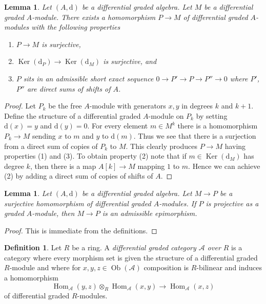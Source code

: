 \documentclass{stacks-project}
\theoremstyle{plain}
\newtheorem{lemma}[subsection]{Lemma}
\theoremstyle{definition}
\newtheorem{definition}[subsection]{Definition}
\theoremstyle{remark}
\numberwithin{equation}{subsection}
\def\Hom{\mathop{\mathrm{Hom}}\nolimits}
\def\Ob{\mathop{\mathrm{Ob}}\nolimits}
\def\Ker{\mathop{\mathrm{Ker}}}
\begin{document}
\begin{lemma}
\label{lemma-good-quotient}
Let $(A, \text{d})$ be a differential graded algebra.
Let $M$ be a differential graded $A$-module. There exists a homomorphism
$P \to M$ of differential graded $A$-modules with the following
properties
\begin{enumerate}
\item $P \to M$ is surjective,
\item $\Ker(\text{d}_P) \to \Ker(\text{d}_M)$ is surjective, and
\item $P$ sits in an admissible short exact sequence
$0 \to P' \to P \to P'' \to 0$ where $P'$, $P''$ are direct sums
of shifts of $A$.
\end{enumerate}
\end{lemma}

\begin{proof}
Let $P_k$ be the free $A$-module with generators $x, y$ in degrees
$k$ and $k + 1$. Define the structure of a differential graded
$A$-module on $P_k$ by setting $\text{d}(x) = y$ and $\text{d}(y) = 0$.
For every element $m \in M^k$ there is a homomorphism
$P_k \to M$ sending $x$ to $m$ and $y$ to $\text{d}(m)$.
Thus we see that there is a surjection from a direct sum
of copies of $P_k$ to $M$. This clearly produces $P \to M$
having properties (1) and (3). To obtain property (2) note
that if $m \in \Ker(\text{d}_M)$ has degree $k$, then there is a map
$A[k] \to M$ mapping $1$ to $m$. Hence we can achieve (2) by adding
a direct sum of copies of shifts of $A$.
\end{proof}

\begin{lemma}
\label{lemma-target-graded-projective}
Let $(A, \text{d})$ be a differential graded algebra.
Let $M \to P$ be a surjective homomorphism of differential graded
$A$-modules. If $P$ is projective as a graded $A$-module, then
$M \to P$ is an admissible epimorphism.
\end{lemma}

\begin{proof}
This is immediate from the definitions.
\end{proof}

\begin{definition}
\label{definition-dga-category}
Let $R$ be a ring. A {\it differential graded category $\mathcal{A}$
over $R$} is a category where every morphism set is given the structure
of a differential graded $R$-module and where for
$x, y, z \in \Ob(\mathcal{A})$ composition is $R$-bilinear and induces
a homomorphism
$$
\Hom_\mathcal{A}(y, z) \otimes_R \Hom_\mathcal{A}(x, y)
\longrightarrow
\Hom_\mathcal{A}(x, z)
$$
of differential graded $R$-modules.
\end{definition}
\end{document}
